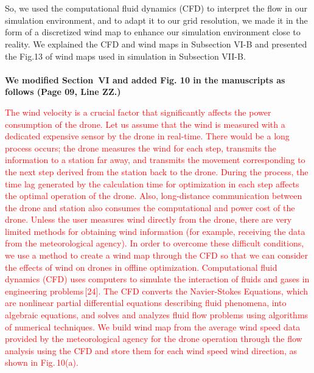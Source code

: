 \documentclass[onecolumn]{IEEEconf}
\begin{document}
\begin{description}
{    ~\\
    ~\\
    So, we used the computational fluid dynamics (CFD) to interpret the flow in our simulation environment, and to adapt it to our grid resolution, we made it in the form of a discretized wind map to enhance our simulation environment close to reality.
    We explained the CFD and wind maps in Subsection VI-B and presented the Fig.13 of wind maps used in simulation in Subsection VII-B.
	}
	~\\
    ~\\
	\textbf{We modified Section~VI and added Fig. 10 in the manuscripts as follows (Page 09, Line ZZ.)}\\
    \begin{mdframed}[ linewidth=.75pt, userdefinedwidth=0.9\textwidth]
    \justify
    \textcolor{red}{The wind velocity is a crucial factor that significantly affects the power consumption of the drone. Let us assume that the wind is measured with a dedicated expensive sensor by the drone in real-time. There would be a long process occurs; 
    the drone measures the wind for each step, transmits the information to a station far away, and transmits the movement corresponding to the next step derived from the station back to the drone.
    During the process, the time lag generated by the calculation time for optimization in each step affects the optimal operation of the drone. 
    Also, long-distance communication between the drone and station also consumes the computational and power cost of the drone.
    Unless the user measures wind directly from the drone, there are very limited methods for obtaining wind information (for example, receiving the data from the meteorological agency).
    In order to overcome these difficult conditions, we use a method to create a wind map through the CFD so that we can consider the effects of wind on drones in offline optimization.
    Computational fluid dynamics (CFD) uses computers to simulate the interaction of fluids and gases in engineering problems\,[24]. 
    The CFD converts the Navier-Stokes Equations, which are nonlinear partial differential equations describing fluid phenomena, into algebraic equations, and solves and analyzes fluid flow problems using algorithms of numerical techniques.
    We build wind map from the average wind speed data provided by the meteorological agency for the drone operation through the flow analysis using the CFD and store them for each wind speed wind direction, as shown in Fig.\,10(a).}~\\

\end{mdframed}
\end{description}
\end{document}
